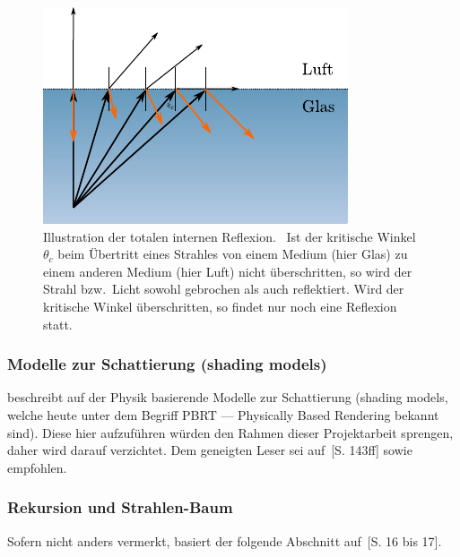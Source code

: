 \begin{figure}[H]\label{fig:ray_tracing_total_internal_reflection}
    \centering
    \includegraphics{img/total_internal_reflection.pdf}
    \caption{Illustration der totalen internen
        Reflexion.~\protect\footnotemark{}
        Ist der kritische Winkel $\theta_{c}$ beim Übertritt eines
        Strahles von einem Medium (hier Glas) zu einem anderen Medium (hier
        Luft) nicht überschritten, so wird der Strahl bzw.\ Licht sowohl
        gebrochen als auch reflektiert. Wird der kritische Winkel
        überschritten, so findet nur noch eine Reflexion
        statt.\protect\footnotemark}
\end{figure}

\subsubsection{Modelle zur Schattierung (shading models)}
\label{ssubsec:ray_tracing:shading_models}

\citeauthor{glassner_introduction_1989} beschreibt auf der Physik
basierende Modelle zur Schattierung (shading models, welche heute unter
dem Begriff PBRT --- Physically Based Rendering bekannt sind). Diese
hier aufzuführen würden den Rahmen dieser Projektarbeit sprengen, daher
wird darauf verzichtet. Dem geneigten Leser sei
auf~[S. 143ff]
sowie~ empfohlen.

\subsubsection{Rekursion und Strahlen-Baum}
\label{ssubsec:ray_tracing:recursion}

Sofern nicht anders vermerkt, basiert der folgende Abschnitt
auf~\cite{glassner_introduction_1989}[S. 16 bis 17].

